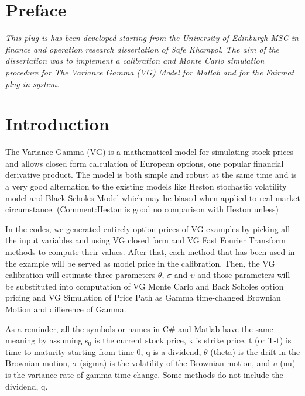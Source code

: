 \newcommand{\pluginName}{Variance Gamma Model}
\newcommand{\pluginVersion}{1.0}




\PluginTitle{\pluginName}{\pluginVersion}

\section{Preface}
\emph{This plug-is has been developed starting from the University of Edinburgh MSC in finance and operation research dissertation of Safe Khampol. The aim of the dissertation was to implement a calibration and Monte Carlo simulation procedure for The Variance Gamma (VG) Model for Matlab and for the Fairmat plug-in system.} 

\section{Introduction}
The Variance Gamma (VG) is a  mathematical model for simulating stock prices and allows closed form 
calculation of European options, one popular financial derivative product. 
The model is both simple and robust at the same time and is a very good 
alternation to the existing models like Heston stochastic volatility model 
and Black-Scholes Model which may be biased when applied to real market 
circumstance. (Comment:Heston is good no comparison with Heston unless)

In the codes, we generated entirely option prices of VG examples by picking 
all the input variables and using VG closed form and VG Fast Fourier 
Transform methods to compute their values. After that, each method that has 
been used in the example will be served as model price in the calibration. 
Then, the VG calibration will estimate three parameters $\theta $, $\sigma $ 
and $\upsilon $ and those parameters will be substituted into computation of 
VG Monte Carlo and Back Scholes option pricing and VG Simulation of Price 
Path as Gamma time-changed Brownian Motion and difference of Gamma.

As a reminder, all the symbols or names in C{\#} and Matlab have the same 
meaning by assuming s$_{0}$ is the current stock price, k is strike price, t 
(or T-t) is time to maturity starting from time 0, q is a dividend, $\theta 
$ (theta) is the drift in the Brownian motion, $\sigma $ (sigma) is the 
volatility of the Brownian motion, and $\upsilon $ (nu) is the variance rate 
of gamma time change. Some methods do not include the dividend, q.

